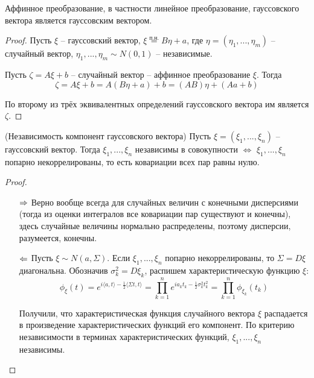 \begin{corollary}
    Аффинное преобразование, в частности линейное преобразование, гауссовского вектора является гауссовским вектором.
\end{corollary}

\begin{proof}
    Пусть $\xi$ -- гауссовский вектор, $\xi \stackrel{\text{п.н.}}{=} B\eta + a$, где $\eta = (\eta_1, ..., \eta_m)$ -- случайный вектор, $\eta_1, ..., \eta_m \sim N(0, 1)$ -- независимые.
    
    Пусть $\zeta = A \xi + b$ -- случайный вектор -- аффинное преобразование $\xi$. Тогда
    \[
        \zeta = A \xi + b = A (B\eta + a) + b = (AB)\eta +(Aa + b)
    \]

    По второму из трёх эквивалентных определений гауссовского вектора им является $\zeta$.
\end{proof}

\begin{corollary} (Независимость компонент гауссовского вектора)
    Пусть $\xi = (\xi_1, ..., \xi_n)$ -- гауссовский вектор. Тогда $\xi_1, ..., \xi_n$ независимы в совокупности $\Leftrightarrow$ $\xi_1, ..., \xi_n$ попарно некоррелированы, то есть ковариации всех пар равны нулю.
\end{corollary}

\begin{proof}~
    \begin{itemize}
        \item[$\Rightarrow$] Верно вообще всегда для случайных величин с конечными дисперсиями (тогда из оценки интегралов все ковариации пар существуют и конечны), здесь случайные величины нормально распределены, поэтому дисперсии, разумеется, конечны.

        \item[$\Leftarrow$] Пусть $\xi \sim N(a, \Sigma)$. Если $\xi_1, ..., \xi_n$ попарно некоррелированы, то $\Sigma = D\xi$ диагональна. Обозначив $\sigma_k^2 = D \xi_k$, распишем характеристическую функцию $\xi$:
        \[
            \phi_\xi(t) = e^{i \langle a, t \rangle - \frac{1}{2} \langle \Sigma t, t \rangle} = \prod_{k=1}^n e^{i a_k t_k - \frac{1}{2} \sigma_k^2 t_k^2} = \prod_{k=1}^n \phi_{\xi_k}(t_k)
        \]

        Получили, что характеристическая функция случайного вектора $\xi$ распадается в произведение характеристических функций его компонент. По критерию независимости в терминах характеристических функций, $\xi_1, ..., \xi_n$ независимы.
    \end{itemize}
\end{proof}


